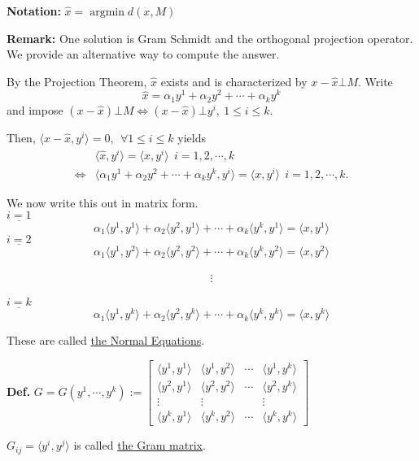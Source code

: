 \documentclass[letterpaper]{article}
\begin{document}
\noindent \textbf{Notation:} $\hat{x} = \operatorname*{argmin}d(x,M)$

\noindent \textbf{Remark:} One solution is Gram Schmidt and the orthogonal projection operator.
We provide an alternative way to compute the answer.

By the Projection Theorem, $\hat{x} $ exists and is characterized by $x-\hat{x} \bot M$.
Write
$$\hat{x}= \alpha_1 y^1+ \alpha_2 y^2+ \cdots +\alpha_k y^k$$
and impose $(x-\hat{x})\bot M \Leftrightarrow (x-\hat{x}) \bot y^i,~ 1 \le i \le k$.

Then, $ \langle x-\hat{x},y^i \rangle =0,~~\forall 1 \leq i \leq k$ yields
\begin{align*}
&\langle \hat{x},y^i \rangle = \langle x,y^i \rangle     ~~  i=1,2,\cdots, k \\
\Leftrightarrow&\langle \alpha_1 y^1+ \alpha_2 y^2+\cdots +\alpha_k y^k, y^i \rangle  =  \langle x,y^i \rangle      ~~   i=1,2,\cdots ,k.
\end{align*}

We now write this out in matrix form.\\
$\underline{i=1}$
$$\alpha_1  \langle y^1,y^1 \rangle +\alpha_2  \langle y^2,y^1 \rangle + \cdots + \alpha_k  \langle y^k,y^1 \rangle =  \langle x,y^1 \rangle $$
$\underline{i=2}$
$$\alpha_1  \langle y^1,y^2 \rangle +\alpha_2  \langle y^2,y^2 \rangle + \cdots + \alpha_k  \langle y^k,y^2 \rangle =  \langle x,y^2 \rangle $$ \\
$$\vdots$$\\
$\underline{i=k}$
$$\alpha_1  \langle y^1,y^k \rangle +\alpha_2  \langle y^2,y^k \rangle + \cdots + \alpha_k  \langle y^k,y^k \rangle =  \langle x,y^k \rangle $$

\noindent These are called \underline{the Normal Equations}.

\noindent \textbf{Def.}
$G=G(y^1,\cdots , y^k):=\left[ \begin{array}{cccc}  \langle y^1,y^1 \rangle  &  \langle y^1,y^2 \rangle  & \cdots &  \langle y^1,y^k \rangle  \\  \langle y^2,y^1 \rangle  &  \langle y^2,y^2 \rangle  & \cdots &  \langle y^2,y^k \rangle \\ \vdots & \vdots && \vdots \\  \langle y^k,y^1 \rangle  &  \langle y^k,y^2 \rangle  & \cdots &  \langle y^k,y^k \rangle  \end{array}  \right]$

$G_{ij}= \langle y^i,y^j \rangle $ is called \underline{the Gram matrix}.\\
\end{document}
